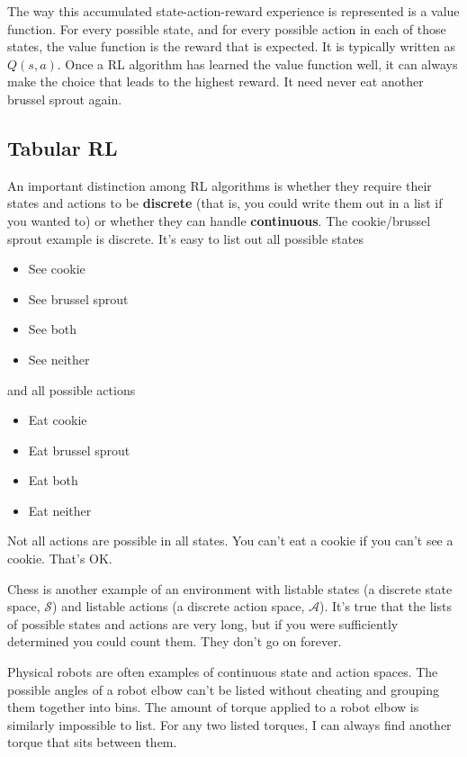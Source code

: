 The way this accumulated state-action-reward experience is represented
is a value function. For every possible state, and for every possible action
in each of those states, the value function is the reward that is expected.
It is typically written as $Q(s, a)$. Once a RL algorithm has learned the
value function well, it can always make the choice that leads
to the highest reward. It need never eat another brussel sprout again.


\subsection{Tabular RL}
\label{subsec:introtabular}

An important distinction among RL algorithms is whether they require their
states and actions to be \textbf{discrete} (that is, you could write
them out in a list if you wanted to) or whether they can handle
\textbf{continuous}. The cookie/brussel sprout example is discrete.
It's easy to list out all possible states
\begin{itemize}
  \item{See cookie}
  \item{See brussel sprout}
  \item{See both}
  \item{See neither}
\end{itemize}
and all possible actions
\begin{itemize}
  \item{Eat cookie}
  \item{Eat brussel sprout}
  \item{Eat both}
  \item{Eat neither}
\end{itemize}
Not all actions are possible in all states. You can't eat a cookie
if you can't see a cookie. That's OK.

Chess is another example of an environment with listable states
(a discrete state space, $\mathcal{S}$) and listable actions
(a discrete action space, $\mathcal{A}$). It's true that the lists
of possible states and actions are very long, but if you were sufficiently
determined you could count them. They don't go on forever.

Physical robots are often examples of continuous state and action spaces.
The possible angles of a robot elbow can't be listed without cheating and
grouping them together into bins. The amount of torque applied to a robot
elbow is similarly impossible to list. For any two listed torques,
I can always find another torque that sits between them.

